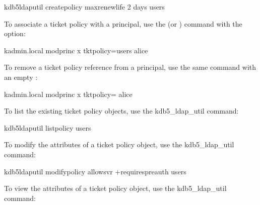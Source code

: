 \documentclass[letterpaper,10pt,english]{sphinxmanual}
\begin{document}
%
\begin{sphinxVerbatim}[commandchars=\\\{\}]
\PYGZdl{} kdb5\PYGZus{}ldap\PYGZus{}util create\PYGZus{}policy \PYGZhy{}maxrenewlife \PYGZdq{}2 days\PYGZdq{} users
\end{sphinxVerbatim}

To associate a ticket policy with a principal, use the
{\hyperref[\detokenize{admin/admin_commands/kadmin_local:kadmin-1}]{}}  (or ) command
with the  option:

%
\begin{sphinxVerbatim}[commandchars=\\\{\}]
\PYGZdl{} kadmin.local modprinc \PYGZhy{}x tktpolicy=users alice
\end{sphinxVerbatim}

To remove a ticket policy reference from a principal, use the same
command with an empty :

%
\begin{sphinxVerbatim}[commandchars=\\\{\}]
\PYGZdl{} kadmin.local modprinc \PYGZhy{}x tktpolicy= alice
\end{sphinxVerbatim}

To list the existing ticket policy objects, use the kdb5\_ldap\_util
 command:

%
\begin{sphinxVerbatim}[commandchars=\\\{\}]
\PYGZdl{} kdb5\PYGZus{}ldap\PYGZus{}util list\PYGZus{}policy
users
\end{sphinxVerbatim}

To modify the attributes of a ticket policy object, use the
kdb5\_ldap\_util  command:

%
\begin{sphinxVerbatim}[commandchars=\\\{\}]
\PYGZdl{} kdb5\PYGZus{}ldap\PYGZus{}util modify\PYGZus{}policy \PYGZhy{}allow\PYGZus{}svr +requires\PYGZus{}preauth users
\end{sphinxVerbatim}

To view the attributes of a ticket policy object, use the
kdb5\_ldap\_util  command:
\end{document}
